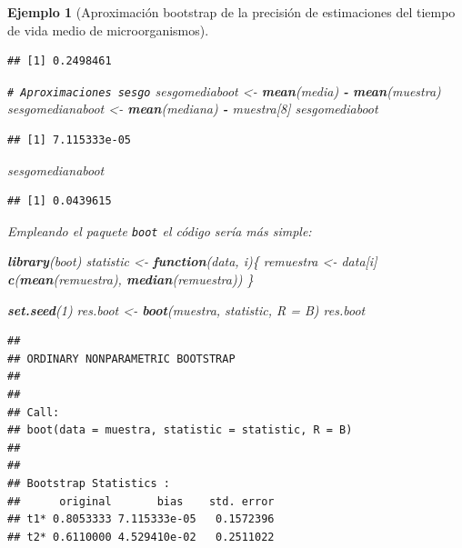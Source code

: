 \documentclass[
]{book}
\newenvironment{Shaded}{\begin{snugshade}}{\end{snugshade}}
\newcommand{\AttributeTok}[1]{\textcolor[rgb]{0.13,0.29,0.53}{#1}}
\newcommand{\CommentTok}[1]{\textcolor[rgb]{0.56,0.35,0.01}{\textit{#1}}}
\newcommand{\ControlFlowTok}[1]{\textcolor[rgb]{0.13,0.29,0.53}{\textbf{#1}}}
\newcommand{\DecValTok}[1]{\textcolor[rgb]{0.00,0.00,0.81}{#1}}
\newcommand{\FunctionTok}[1]{\textcolor[rgb]{0.13,0.29,0.53}{\textbf{#1}}}
\newcommand{\NormalTok}[1]{#1}
\newcommand{\OtherTok}[1]{\textcolor[rgb]{0.56,0.35,0.01}{#1}}
\newcommand{\SpecialCharTok}[1]{\textcolor[rgb]{0.81,0.36,0.00}{\textbf{#1}}}
\theoremstyle{break}
\newtheorem{example}{Ejemplo}[chapter]
\theoremstyle{nonumberplain}
\renewcommand{\CommentTok}[1]{\textcolor[rgb]{0.41,0.41,0.41}{\texttt{#1}}}
\begin{document}
\begin{example}[Aproximación bootstrap de la precisión de estimaciones del tiempo de vida medio de microorganismos]
\begin{verbatim}
## [1] 0.2498461
\end{verbatim}

\begin{Shaded}
\begin{Highlighting}[]
\CommentTok{\# Aproximaciones sesgo}
\NormalTok{sesgomediaboot }\OtherTok{\textless{}{-}} \FunctionTok{mean}\NormalTok{(media) }\SpecialCharTok{{-}} \FunctionTok{mean}\NormalTok{(muestra)}
\NormalTok{sesgomedianaboot }\OtherTok{\textless{}{-}} \FunctionTok{mean}\NormalTok{(mediana) }\SpecialCharTok{{-}}\NormalTok{ muestra[}\DecValTok{8}\NormalTok{]}
\NormalTok{sesgomediaboot}
\end{Highlighting}
\end{Shaded}

\begin{verbatim}
## [1] 7.115333e-05
\end{verbatim}

\begin{Shaded}
\begin{Highlighting}[]
\NormalTok{sesgomedianaboot}
\end{Highlighting}
\end{Shaded}

\begin{verbatim}
## [1] 0.0439615
\end{verbatim}

Empleando el paquete \texttt{boot} el código sería más simple:

\begin{Shaded}
\begin{Highlighting}[]
\FunctionTok{library}\NormalTok{(boot)}
\NormalTok{statistic }\OtherTok{\textless{}{-}} \ControlFlowTok{function}\NormalTok{(data, i)\{}
\NormalTok{  remuestra }\OtherTok{\textless{}{-}}\NormalTok{ data[i]}
  \FunctionTok{c}\NormalTok{(}\FunctionTok{mean}\NormalTok{(remuestra), }\FunctionTok{median}\NormalTok{(remuestra))}
\NormalTok{\}}

\FunctionTok{set.seed}\NormalTok{(}\DecValTok{1}\NormalTok{)}
\NormalTok{res.boot }\OtherTok{\textless{}{-}} \FunctionTok{boot}\NormalTok{(muestra, statistic, }\AttributeTok{R =}\NormalTok{ B)}
\NormalTok{res.boot}
\end{Highlighting}
\end{Shaded}

\begin{verbatim}
## 
## ORDINARY NONPARAMETRIC BOOTSTRAP
## 
## 
## Call:
## boot(data = muestra, statistic = statistic, R = B)
## 
## 
## Bootstrap Statistics :
##      original       bias    std. error
## t1* 0.8053333 7.115333e-05   0.1572396
## t2* 0.6110000 4.529410e-02   0.2511022
\end{verbatim}


\end{example}
\end{document}
